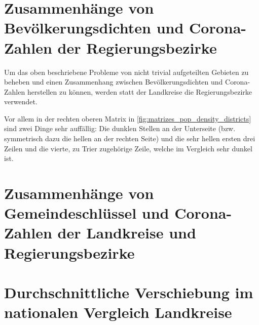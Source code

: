 \section{Zusammenhänge von Bevölkerungsdichten und Corona-Zahlen der Regierungsbezirke}
Um das oben beschriebene Probleme von nicht trivial aufgeteilten Gebieten zu beheben und einen Zusammenhang zwischen Bevölkerungsdichten und Corona-Zahlen herstellen zu können, werden statt der Landkreise die Regierungsbezirke verwendet.

Vor allem in der rechten oberen Matrix in \autoref{fig:matrizes_pop_density_districts} sind zwei Dinge sehr auffällig: Die dunklen Stellen an der Unterseite (bzw. symmetrisch dazu die hellen an der rechten Seite) und die sehr hellen ersten drei Zeilen und die vierte, zu Trier zugehörige Zeile, welche im Vergleich sehr dunkel ist.


\section{Zusammenhänge von Gemeindeschlüssel und Corona-Zahlen der Landkreise und Regierungsbezirke}


\section{Durchschnittliche Verschiebung im nationalen Vergleich Landkreise}

